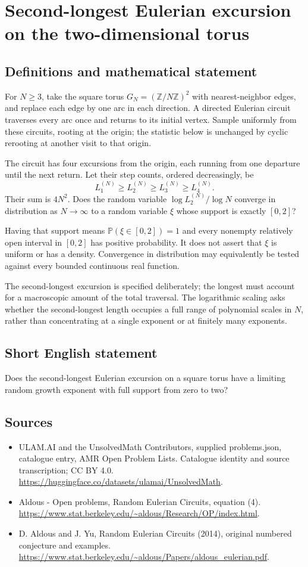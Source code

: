 \documentclass[11pt,a4paper]{article}
\begin{document}
\section*{Second-longest Eulerian excursion on the two-dimensional torus}\label{statement}

\subsection{Definitions and mathematical statement}
For $N\ge3$, take the square torus $G_N=(\mathbb Z/N\mathbb Z)^2$ with nearest-neighbor edges, and replace each edge by one arc in each direction. A directed Eulerian circuit traverses every arc once and returns to its initial vertex. Sample uniformly from these circuits, rooting at the origin; the statistic below is unchanged by cyclic rerooting at another visit to that origin.

The circuit has four excursions from the origin, each running from one departure until the next return. Let their step counts, ordered decreasingly, be
\[
L_1^{(N)}\ge L_2^{(N)}\ge L_3^{(N)}\ge L_4^{(N)}.
\]
Their sum is $4N^2$. Does the random variable $\log L_2^{(N)}/\log N$ converge in distribution as $N\to\infty$ to a random variable $\xi$ whose support is exactly $[0,2]$?

Having that support means $\mathbb P(\xi\in[0,2])=1$ and every nonempty relatively open interval in $[0,2]$ has positive probability. It does not assert that $\xi$ is uniform or has a density. Convergence in distribution may equivalently be tested against every bounded continuous real function.

The second-longest excursion is specified deliberately; the longest must account for a macroscopic amount of the total traversal. The logarithmic scaling asks whether the second-longest length occupies a full range of polynomial scales in $N$, rather than concentrating at a single exponent or at finitely many exponents.
\subsection{Short English statement}
Does the second-longest Eulerian excursion on a square torus have a limiting random growth exponent with full support from zero to two?
\subsection{Sources}
\begin{itemize}
\item[S1] ULAM.AI and the UnsolvedMath Contributors, supplied problems.json, catalogue entry, AMR Open Problem Lists. Catalogue identity and source transcription; CC BY 4.0.
\url{https://huggingface.co/datasets/ulamai/UnsolvedMath}.
\item[S2] Aldous - Open problems, Random Eulerian Circuits, equation (4). 
\url{https://www.stat.berkeley.edu/~aldous/Research/OP/index.html}.
\item[S3] D. Aldous and J. Yu, Random Eulerian Circuits (2014), original numbered conjecture and examples.
\url{https://www.stat.berkeley.edu/~aldous/Papers/aldous_eulerian.pdf}.
\end{itemize}
\end{document}

